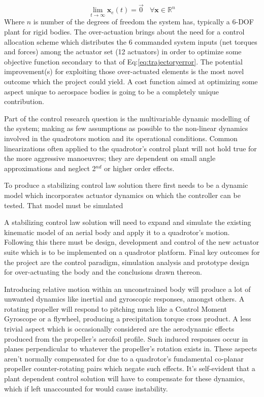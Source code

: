 \begin{equation} \label{eq:trajectoryerror}
\lim_{t \rightarrow \infty} \mathbf{x}_e(t) = \vec{0}~~~~\forall \mathbf{x} \in \mathbb{R}^n
\end{equation}
Where $n$ is number of the degrees of freedom the system has, typically a 6-DOF plant for rigid bodies. The over-actuation brings about the need for a control allocation scheme which distributes the 6 commanded system inputs (net torques and forces) among the actuator set (12 actuators) in order to optimize some objective function secondary to that of Eq:\ref{eq:trajectoryerror}. The potential improvement(s) for exploiting those over-actuated elements is the most novel outcome which the project could yield. A cost function aimed at optimizing some aspect unique to aerospace bodies is going to be a completely unique contribution.
\par
Part of the control research question is the multivariable dynamic modelling of the system; making as few assumptions as possible to the non-linear dynamics involved in the quadrotors motion and its operational conditions. Common linearizations often applied to the quadrotor's control plant will not hold true for the more aggressive manoeuvres; they are dependent on small angle approximations and neglect 2$^{nd}$ or higher order effects. 

To produce a stabilizing control law solution there first needs to be a dynamic model which incorporates actuator dynamics on which the controller can be tested. That model must be simulated 

A stabilizing control law solution will need to expand and simulate the existing kinematic model of an aerial body and apply it to a quadrotor's motion. Following this there must be design, development and control of the new actuator suite which is to be implemented on a quadrotor platform. Final key outcomes for the project are the control paradigm, simulation analysis and prototype design for over-actuating the body and the conclusions drawn thereon.
\par
Introducing relative motion within an unconstrained body will produce a lot of unwanted dynamics like inertial and gyroscopic responses, amongst others. A rotating propeller will respond to pitching much like a Control Moment Gyroscope \cite{cmg} or a flywheel, producing a precipitation torque cross product. A less trivial aspect which is occasionally considered are the aerodynamic effects produced from the propeller's aerofoil profile. Such induced responses occur in planes perpendicular to whatever the propeller's rotation exists in. These aspects aren't normally compensated for due to a quadrotor's fundamental co-planar propeller counter-rotating pairs which negate such effects. It's self-evident that a plant dependent control solution will have to compensate for these dynamics, which if left unaccounted for would cause instability.
